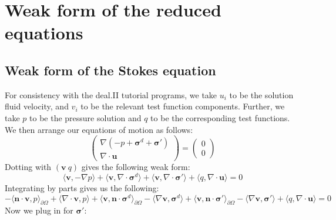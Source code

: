 \documentclass[reqno]{article}
\begin{document}
  \section{Weak form of the reduced equations}
  \subsection{Weak form of the Stokes equation}
  For consistency with the deal.II tutorial programs, we take $u_i$ to be the
  solution fluid velocity, and $v_i$ to be the relevant test function
  components.
  Further, we take $p$ to be the pressure solution and $q$ to be the
  corresponding test functions.
  We then arrange our equations of motion as follows:
  \begin{equation}
    \begin{pmatrix}
      \nabla \left(
        -p + \boldsymbol\sigma^d + \boldsymbol\sigma'
      \right) \\
      \nabla \cdot \mathbf{u}
    \end{pmatrix}
    =
    \begin{pmatrix}
      0 \\
      0
    \end{pmatrix}
  \end{equation}
  Dotting with $(\mathbf{v} \: q)$ gives the following weak form:
  \begin{equation}
    \langle \mathbf{v}, -\nabla p \rangle
    + \langle \mathbf{v}, \nabla \cdot \boldsymbol\sigma^d \rangle
    + \langle \mathbf{v}, \nabla \cdot \boldsymbol\sigma' \rangle
    + \langle q, \nabla \cdot \mathbf{u} \rangle
    =
    0
  \end{equation}
  Integrating by parts gives us the following:
  \begin{equation}
    -\langle \mathbf{n} \cdot \mathbf{v}, p \rangle_{\partial \Omega}
    + \langle \nabla \cdot \mathbf{v}, p \rangle
    + \langle \mathbf{v}, \mathbf{n} \cdot \boldsymbol\sigma^d \rangle_{\partial \Omega}
    - \langle \nabla \mathbf{v}, \boldsymbol\sigma^d \rangle
    + \langle \mathbf{v}, \mathbf{n} \cdot \boldsymbol\sigma' \rangle_{\partial \Omega}
    - \langle \nabla \mathbf{v}, \boldsymbol\sigma' \rangle
    + \langle q, \nabla \cdot \mathbf{u} \rangle
    =
    0
  \end{equation}
  Now we plug in for $\mathbf{\sigma}'$:
\end{document}
